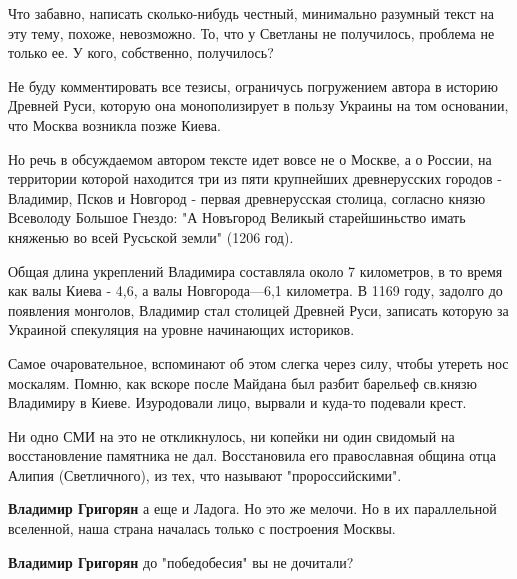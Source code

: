 \begin{itemize}
Что забавно, написать сколько-нибудь честный, минимально разумный текст на эту
тему, похоже, невозможно. То, что у Светланы не получилось, проблема не только
ее. У кого, собственно, получилось? 

Не буду комментировать все тезисы, ограничусь погружением автора в историю
Древней Руси, которую она монополизирует в пользу Украины на том основании, что
Москва возникла позже Киева. 

Но речь в обсуждаемом автором тексте идет вовсе не о Москве, а о России, на
территории которой находится три из пяти крупнейших древнерусских городов -
Владимир, Псков и Новгород - первая древнерусская столица, согласно князю
Всеволоду Большое Гнездо: "А Новъгород Великый старейшиньство имать княженью во
всей Русьской земли" (1206 год). 

Общая длина укреплений Владимира составляла около 7 километров, в то время как
валы Киева - 4,6, а валы Новгорода—6,1 километра. В 1169 году, задолго до
появления монголов, Владимир стал столицей Древней Руси, записать которую за
Украиной спекуляция на уровне начинающих историков. 

Самое очаровательное, вспоминают об этом слегка через силу, чтобы утереть нос
москалям. Помню, как вскоре после Майдана был разбит барельеф св.князю
Владимиру в Киеве. Изуродовали лицо, вырвали и куда-то подевали крест.

Ни одно СМИ на это не откликнулось, ни копейки ни один свидомый на
восстановление памятника не дал. Восстановила его православная община отца
Алипия (Светличного), из тех, что называют "пророссийскими".


\begin{itemize}
 
\textbf{Владимир Григорян} а еще и Ладога. Но это же мелочи. Но в их параллельной вселенной, наша страна началась только с построения Москвы.

 
\textbf{Владимир Григорян} до "победобесия" вы не дочитали?


\end{itemize}
\end{itemize}
